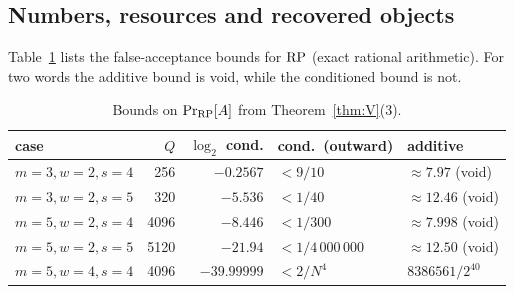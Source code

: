 \subsection{Numbers, resources and recovered objects}
Table~\ref{tab:fp} lists the false-acceptance bounds for $\mathrm{RP}$ (exact rational arithmetic).
For two words the additive bound is void, while the conditioned bound is not.
\begin{table}[ht]\small
\caption{Bounds on $\Pr_{\mathrm{RP}}[A]$ from Theorem~\ref{thm:V}(3).}\label{tab:fp}
\begin{tabular}{lrrll}
\toprule
case & $Q$ & $\log_2$ cond. & cond.\ (outward) & additive\\
\midrule
$m=3,w=2,s=4$ & 256 & $-0.2567$ & $<9/10$ & $\approx7.97$ (void)\\
$m=3,w=2,s=5$ & 320 & $-5.536$ & $<1/40$ & $\approx12.46$ (void)\\
$m=5,w=2,s=4$ & 4096 & $-8.446$ & $<1/300$ & $\approx7.998$ (void)\\
$m=5,w=2,s=5$ & 5120 & $-21.94$ & $<1/4\,000\,000$ & $\approx12.50$ (void)\\
$m=5,w=4,s=4$ & 4096 & $-39.99999$ & $<2/N^4$ & $8386561/2^{40}$\\
\bottomrule
\end{tabular}
\end{table}

